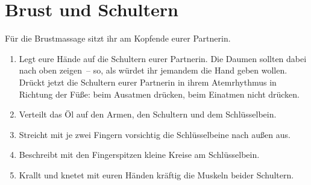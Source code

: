 \section{Brust und Schultern}

Für die Brustmassage sitzt ihr am Kopfende eurer Partnerin.

\begin{enumerate}
	\item {} Legt eure Hände auf die Schultern eurer Partnerin. Die Daumen sollten dabei nach oben zeigen~-- so, als würdet ihr jemandem die Hand geben wollen. Drückt jetzt die Schultern eurer Partnerin in ihrem Atemrhythmus in Richtung der Füße: beim Ausatmen drücken, beim Einatmen nicht drücken.
	\item {} Verteilt das Öl auf den Armen, den Schultern und dem Schlüsselbein.
	\item {} Streicht mit je zwei Fingern vorsichtig die Schlüsselbeine nach außen aus.
	\item {} Beschreibt mit den Fingerspitzen kleine Kreise am Schlüsselbein.
	\item {} Krallt und knetet mit euren Händen kräftig die Muskeln beider Schultern.
\end{enumerate}
